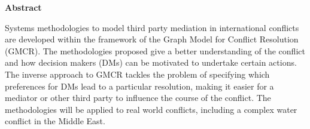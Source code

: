 \documentclass[letterpaper,12pt,titlepage,oneside,final]{book}
\let\origdoublepage\cleardoublepage
\newcommand{\clearemptydoublepage}{%
  \clearpage{\pagestyle{empty}\origdoublepage}}
\let\cleardoublepage\clearemptydoublepage
\begin{document}
\pagestyle{plain}
\setcounter{page}{2}

\cleardoublepage %
 



  


\begin{center}\textbf{Abstract}\end{center}

Systems methodologies to model third party mediation in international conflicts are developed within the framework of the Graph Model for Conflict Resolution (GMCR). The methodologies proposed give a better understanding of the conflict and how decision makers (DMs) can be motivated to undertake certain actions. The inverse approach to GMCR tackles the problem of specifying which preferences  for DMs lead to a particular resolution, making it easier for a mediator or other third party to influence the course of the conflict. The methodologies will be applied to real world conflicts, including a complex water conflict in the Middle East.

\cleardoublepage



\end{document}
